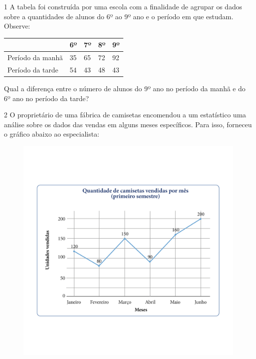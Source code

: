 
\num{1} A tabela foi construída por uma escola com a finalidade de agrupar
os dados sobre a quantidades de alunos do 6º ao 9º ano e o período
em que estudam. Observe:

\begin{longtable}[]{@{}lllll@{}}
\toprule
& 6º & 7º & 8º & 9º\tabularnewline
\midrule
\endhead
Período da manhã & 35 & 65 & 72 & 92\tabularnewline
Período da tarde & 54 & 43 & 48 & 43\tabularnewline
\bottomrule
\end{longtable}

Qual a diferença entre o número de alunos do 9º ano no período da manhã
e do 6º ano no período da tarde?



\num{2} O proprietário de uma fábrica de camisetas encomendou a um
estatístico uma análise sobre os dados das vendas em alguns
meses específicos. Para isso, forneceu o gráfico abaixo ao especialista:

\begin{figure}[htpb!]
\includegraphics[width=\textwidth]{../ilustracoes/MAT5/SAEB_5ANO_MAT_figura101.png}
\end{figure}

